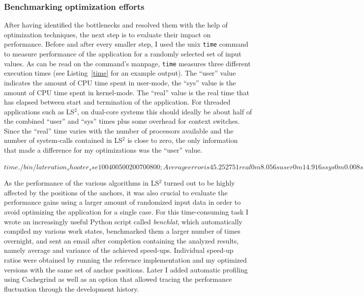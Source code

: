 \subsubsection{Benchmarking optimization efforts}
\label{benchmarking}
After having identified the bottlenecks and resolved them with the help of optimization techniques, the next step is to evaluate their impact on performance. Before and after every smaller step, I used the unix \texttt{time} command to measure performance of the application for a randomly selected set of input values. As can be read on the command's manpage, \texttt{time} measures three different execution times (see Listing~\ref{time} for an example output). The ``user'' value indicates the amount of CPU time spent in user-mode, the ``sys'' value is the amount of CPU time spent in kernel-mode. The ``real'' value is the real time that has elapsed between start and termination of the application. For threaded applications such as LS$^{2}$, on dual-core systems this should ideally be about half of the combined ``user'' and ``sys'' times plus some overhead for context switches. Since the ``real'' time varies with the number of processors available and the number of system-calls contained in LS$^{2}$ is close to zero, the only information that made a difference for my optimizations was the ``user'' value.

\begin{shell}[caption={Example output of the unix \texttt{time} command},label=time]
$ time { ./bin/lateration_shooter_sse 100 400 500 200 700 800 ; }
Average error is 45.252751

real    0m8.056s
user    0m14.916s
sys     0m0.008s
$
\end{shell}

As the performance of the various algorithms in LS$^{2}$ turned out to be highly affected by the positions of the anchors, it was also crucial to evaluate the performance gains using a larger amount of randomized input data in order to avoid optimizing the application for a single case. For this time-consuming task I wrote an increasingly useful Python script called \emph{benchlat}, which automatically compiled my various work states, benchmarked them a larger number of times overnight, and sent an email after completion containing the analyzed results, namely average and variance of the achieved speed-ups. Individual speed-up ratios were obtained by running the reference implementation and my optimized versions with the same set of anchor positions. Later I added automatic profiling using Cachegrind as well as an option that allowed tracing the performance fluctuation through the development history.

